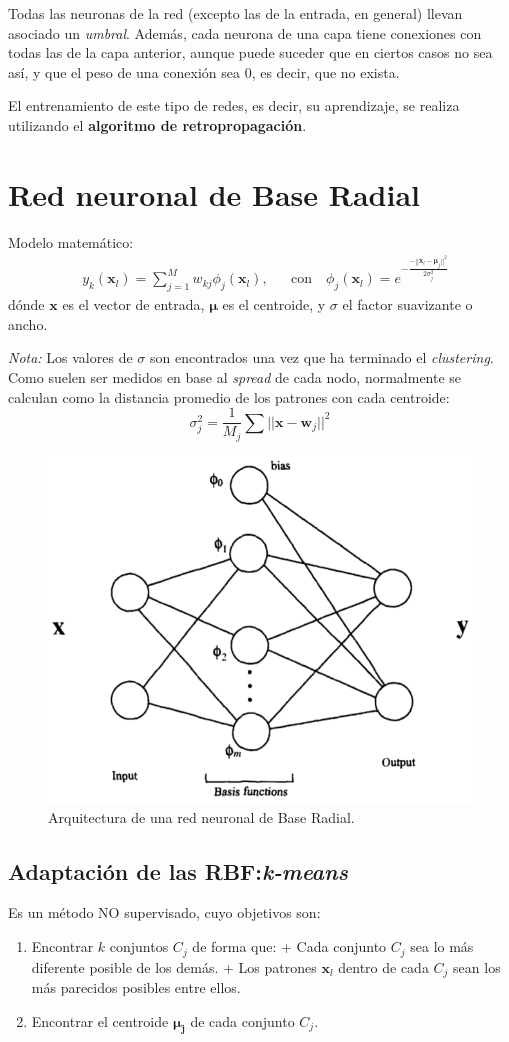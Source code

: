 \documentclass[10pt,a4paper]{article}
\begin{document}
Todas las neuronas de la red (excepto las de la entrada, en general) llevan asociado un \textit{umbral}. Además, cada neurona de una capa tiene conexiones con todas las de la capa anterior, aunque puede suceder que en ciertos casos no sea así, y que el peso de una conexión sea 0, es decir, que no exista.

El entrenamiento de este tipo de redes, es decir, su aprendizaje, se realiza utilizando el \textbf{algoritmo de retropropagación}.

\section{Red neuronal de Base Radial}

Modelo matemático:
\begin{align*}
&y_k (\mathbf{x}_l) = \sum_{j=1}^M w_{kj} \phi_j (\mathbf{x}_l), 
&&\text{con} \quad \phi_j (\mathbf{x}_l) = e^{-\frac{-||\mathbf{x}_l - \mathbf{\mu}_j||^2}{2 \sigma_j^2}}
\end{align*}
dónde $\mathbf{x}$ es el vector de entrada, $\mathbf{\mu}$ es el centroide, y $\sigma$ el factor suavizante o ancho.

\textit{Nota:} Los valores de $\sigma$ son encontrados una vez que ha terminado el \textit{clustering}. Como suelen ser medidos en base al \textit{spread} de cada nodo, normalmente se calculan como la distancia promedio de los patrones con cada centroide:
\[\sigma_j^2 = \frac{1}{M_j} \sum ||\mathbf{x} - \mathbf{w}_j||^2\]

\begin{figure}
  \label{fig:radial}
  \caption{Arquitectura de una red neuronal de Base Radial.}
  \centering
  \hbox{\includegraphics[width=0.5\textwidth-\fboxrule-\fboxrule]{radial.png}}  
\end{figure}	

\subsection{Adaptación de las RBF:\textit{k-means}}
Es un método NO supervisado, cuyo objetivos son:
\begin{enumerate}
\item Encontrar $k$ conjuntos $C_j$ de forma que:
\subitem + Cada conjunto $C_j$ sea lo más diferente posible de los demás.
\subitem + Los patrones $\mathbf{x}_l$ dentro de cada $C_j$ sean los más parecidos posibles entre ellos.
\item Encontrar el centroide $\mathbf{\mu_j}$ de cada conjunto $C_j$.
\end{enumerate}
\end{document}
